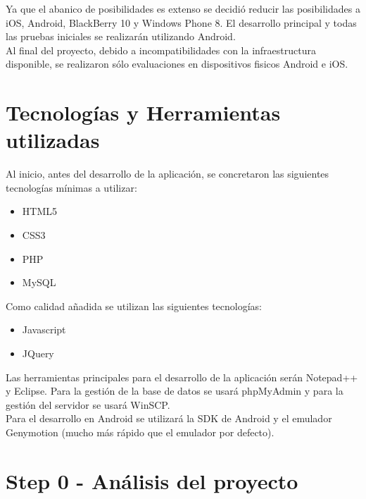 Ya que el abanico de posibilidades es extenso se decidió reducir las posibilidades a iOS, Android, BlackBerry 10 y Windows Phone 8. El desarrollo principal y todas las pruebas iniciales se realizarán utilizando Android.\\

Al final del proyecto, debido a incompatibilidades con la infraestructura disponible, se realizaron sólo evaluaciones en dispositivos fisicos Android e iOS.\\

\section{Tecnologías y Herramientas utilizadas}
\label{tecnologias}

Al inicio, antes del desarrollo de la aplicación, se concretaron las siguientes tecnologías mínimas a utilizar:

\begin{itemize}
\item HTML5
\item CSS3
\item PHP
\item MySQL
\end{itemize}

Como calidad añadida se utilizan las siguientes tecnologías:

\begin{itemize}
\item Javascript
\item JQuery
\end{itemize}

Las herramientas principales para el desarrollo de la aplicación serán Notepad++ y Eclipse. Para la gestión de la base de datos se usará phpMyAdmin y para la gestión del servidor se usará WinSCP.\\

Para el desarrollo en Android se utilizará la SDK de Android y el emulador Genymotion (mucho más rápido que el emulador por defecto).\\


\section{Step 0 - Análisis del proyecto}
\label{step0}

